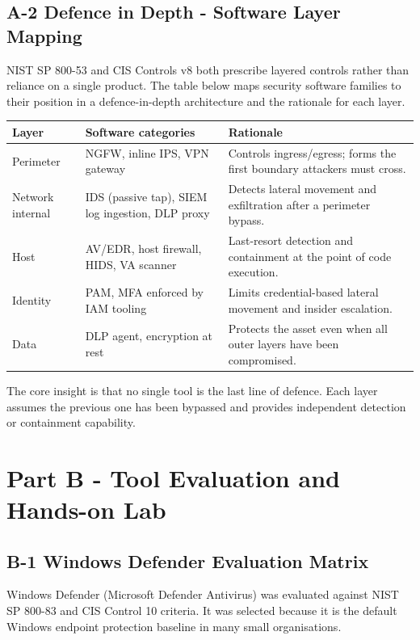 \documentclass[10pt,a4paper]{article}
\begin{document}
\subsection*{A-2 Defence in Depth - Software Layer Mapping}
NIST SP 800-53 and CIS Controls v8 both prescribe layered controls rather than reliance on a single product. The table below maps security software families to their position in a defence-in-depth architecture and the rationale for each layer.

\begin{longtable}{p{2.4cm}p{5.2cm}p{6.6cm}}
\toprule
Layer & Software categories & Rationale \\
\midrule
Perimeter & NGFW, inline IPS, VPN gateway & Controls ingress/egress; forms the first boundary attackers must cross. \\
Network internal & IDS (passive tap), SIEM log ingestion, DLP proxy & Detects lateral movement and exfiltration after a perimeter bypass. \\
Host & AV/EDR, host firewall, HIDS, VA scanner & Last-resort detection and containment at the point of code execution. \\
Identity & PAM, MFA enforced by IAM tooling & Limits credential-based lateral movement and insider escalation. \\
Data & DLP agent, encryption at rest & Protects the asset even when all outer layers have been compromised. \\
\bottomrule
\end{longtable}

\noindent The core insight is that no single tool is the last line of defence. Each layer assumes the previous one has been bypassed and provides independent detection or containment capability.

\section*{Part B - Tool Evaluation and Hands-on Lab}

\subsection*{B-1 Windows Defender Evaluation Matrix}
Windows Defender (Microsoft Defender Antivirus) was evaluated against NIST SP 800-83 and CIS Control 10 criteria. It was selected because it is the default Windows endpoint protection baseline in many small organisations.
\end{document}
